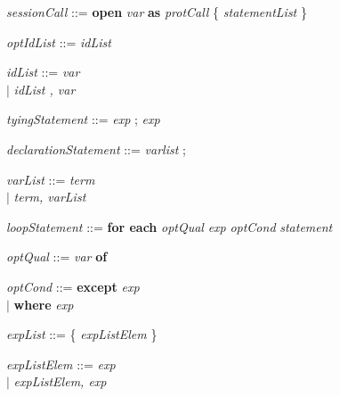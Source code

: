 \textit{sessionCall} ::= \textbf{open} \textit{var} \textbf{as} \textit{protCall} \{ \textit{statementList} \}\smallskip

\textit{optIdList} ::= \textit{idList}\smallskip

\textit{idList} ::= \hspace{2.2em} \textit{var}\\
\hspace*{5.3em} $ | $ \hspace{0.4em} \textit{idList , var}\smallskip

\textit{tyingStatement} ::= \textit{exp} ; \textit{exp}\smallskip

\textit{declarationStatement} ::= \textit{varlist} ;\smallskip

\textit{varList} ::= \hspace{1.5em} \textit{term}\\
\hspace*{5.3em} $ | $ \hspace{0.4em} \textit{term, varList}\smallskip

\textit{loopStatement} ::= \textbf{for each} \textit{optQual} \textit{exp} \textit{optCond} \textit{statement}\smallskip

\textit{optQual} ::= \textit{var} \textbf{of}\smallskip

\textit{optCond} ::= \hspace{1em} \textbf{except} \textit{exp}\\
\hspace*{5.3em} $ | $ \hspace{0.4em} \textbf{where} \textit{exp}\smallskip

\textit{expList} ::= \{ \textit{expListElem} \}\smallskip

\textit{expListElem} ::= \textit{exp}\\
\hspace*{5.3em} $ | $ \hspace{0.4em} \textit{expListElem, exp}
